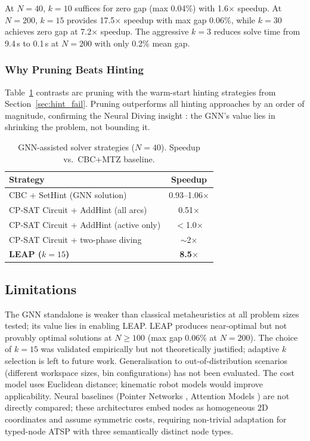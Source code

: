 \documentclass[conference]{IEEEtran}
\begin{document}
At $N{=}40$, $k{=}10$ suffices for zero gap (max 0.04\%) with 1.6$\times$ speedup. At $N{=}200$, $k{=}15$ provides 17.5$\times$ speedup with max gap 0.06\%, while $k{=}30$ achieves zero gap at 7.2$\times$ speedup. The aggressive $k{=}3$ reduces solve time from 9.4\,s to 0.1\,s at $N{=}200$ with only 0.2\% mean gap.

\subsubsection{Why Pruning Beats Hinting}

Table~\ref{tab:hint_comparison} contrasts arc pruning with the warm-start hinting strategies from Section~\ref{sec:hint_fail}. Pruning outperforms all hinting approaches by an order of magnitude, confirming the Neural Diving insight \cite{nair2021neural}: the GNN's value lies in shrinking the problem, not bounding it.

\begin{table}[htbp]
\caption{GNN-assisted solver strategies ($N{=}40$). Speedup vs.\ CBC+MTZ baseline.}
\label{tab:hint_comparison}
\centering
\begin{tabular}{@{}lc@{}}
\toprule
\textbf{Strategy} & \textbf{Speedup} \\
\midrule
CBC + SetHint (GNN solution) & 0.93--1.06$\times$ \\
CP-SAT Circuit + AddHint (all arcs) & 0.51$\times$ \\
CP-SAT Circuit + AddHint (active only) & $<$1.0$\times$ \\
CP-SAT Circuit + two-phase diving & $\sim$2$\times$ \\
\textbf{LEAP ($k{=}15$)} & \textbf{8.5$\times$} \\
\bottomrule
\end{tabular}
\end{table}

\subsection{Limitations}

The GNN standalone is weaker than classical metaheuristics at all problem sizes tested; its value lies in enabling LEAP. LEAP produces near-optimal but not provably optimal solutions at $N{\ge}100$ (max gap 0.06\% at $N{=}200$). The choice of $k{=}15$ was validated empirically but not theoretically justified; adaptive $k$ selection is left to future work. Generalisation to out-of-distribution scenarios (different workspace sizes, bin configurations) has not been evaluated. The cost model uses Euclidean distance; kinematic robot models would improve applicability. Neural baselines (Pointer Networks \cite{vinyals2015pointer}, Attention Models \cite{kool2019attention}) are not directly compared; these architectures embed nodes as homogeneous 2D coordinates and assume symmetric costs, requiring non-trivial adaptation for typed-node ATSP with three semantically distinct node types.
\end{document}
